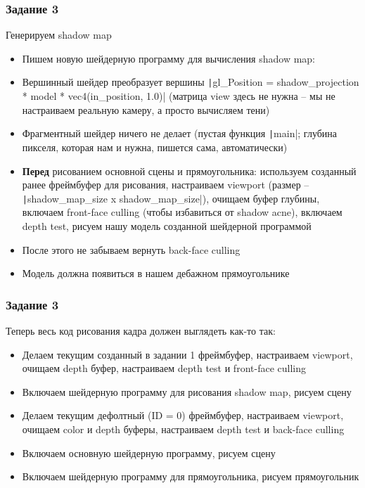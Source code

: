\documentclass[10pt]{beamer}
\begin{document}
\begin{frame}[fragile]
\frametitle{Задание 3}
\begin{footnotesize}
Генерируем shadow map
\begin{itemize}
\item Пишем новую шейдерную программу для вычисления shadow map:
\item Вершинный шейдер преобразует вершины \texttt|gl_Position = shadow_projection * model * vec4(in_position, 1.0)| (матрица view здесь не нужна -- мы не настраиваем реальную камеру, а просто вычисляем тени)
\item Фрагментный шейдер ничего не делает (пустая функция \texttt|main|; глубина пикселя, которая нам и нужна, пишется сама, автоматически)
\item \textbf{Перед} рисованием основной сцены и прямоугольника: используем созданный ранее фреймбуфер для рисования, настраиваем viewport (размер -- \texttt|shadow_map_size x shadow_map_size|), очищаем буфер глубины, включаем front-face culling (чтобы избавиться от shadow acne), включаем depth test, рисуем нашу модель созданной шейдерной программой
\item После этого не забываем вернуть back-face culling
\item Модель должна появиться в нашем дебажном прямоугольнике
\end{itemize}
\end{footnotesize}
\end{frame}

\begin{frame}[fragile]
\frametitle{Задание 3}
Теперь весь код рисования кадра должен выглядеть как-то так:
\begin{itemize}
\item Делаем текущим созданный в задании 1 фреймбуфер, настраиваем viewport, очищаем depth буфер, настраиваем depth test и front-face culling
\item Включаем шейдерную программу для рисования shadow map, рисуем сцену
\item Делаем текущим дефолтный (ID = 0) фреймбуфер, настраиваем viewport, очищаем color и depth буферы, настраиваем depth test и back-face culling
\item Включаем основную шейдерную программу, рисуем сцену
\item Включаем шейдерную программу для прямоугольника, рисуем прямоугольник
\end{itemize}
\end{frame}
\end{document}

